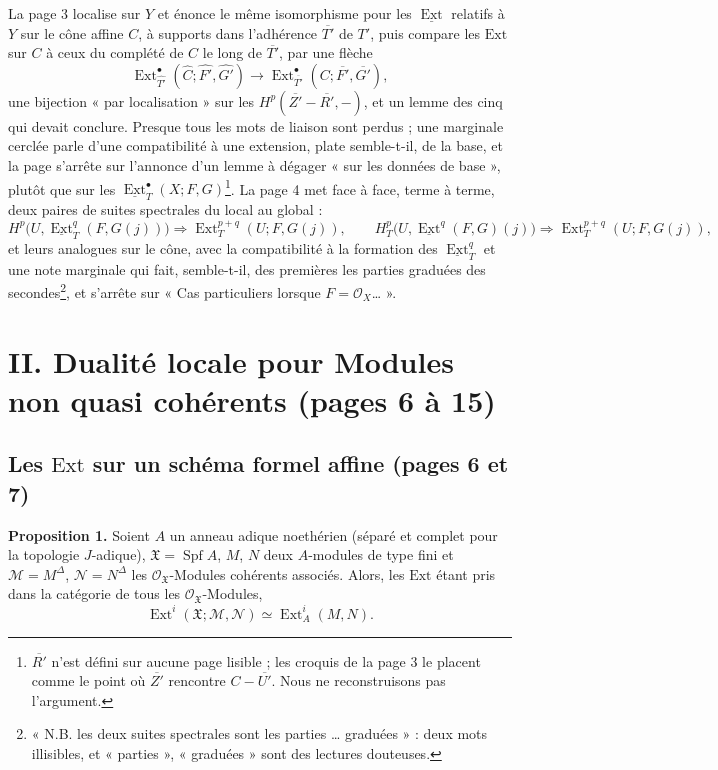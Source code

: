 \documentclass[11pt,a4paper]{article}
\begin{document}
La page 3 localise sur $Y$ et énonce le même isomorphisme pour les
$\underline{\operatorname{Ext}}$ relatifs à $Y$ sur le cône affine $C$, à
supports dans l'adhérence $\overline{T'}$ de $T'$, puis compare les
$\mathrm{Ext}$ sur $C$ à ceux du complété de $C$ le long de $\overline{T'}$,
par une flèche
\[
  \operatorname{Ext}^{\bullet}_{\widehat{T'}}(\widehat{C}; \widehat{F'}, \widehat{G'})
  \longrightarrow \operatorname{Ext}^{\bullet}_{\overline{T'}}(C; \overline{F'}, \overline{G'}),
\]
une bijection « par localisation » sur les
$H^p(\overline{Z'} - \overline{R'}, -)$, et un lemme des cinq qui devait
conclure. Presque tous les mots de liaison sont perdus ; une marginale
cerclée parle d'une compatibilité à une extension, plate semble-t-il, de la
base, et la page s'arrête sur l'annonce d'un lemme à dégager « sur les données
de base », plutôt que sur les $\underline{\operatorname{Ext}}^{\bullet}_T(X; F,
G)$\footnote{$\overline{R'}$ n'est défini sur aucune page lisible ;
les croquis de la page 3 le placent comme le point où $\overline{Z'}$ rencontre
$C - \overline{U'}$. Nous ne reconstruisons pas l'argument.}. La page 4 met
face à face, terme à terme, deux paires de suites spectrales du local au
global :
\[
  H^p\bigl(U, \underline{\operatorname{Ext}}^q_{T}(F, G(j))\bigr) \Rightarrow
  \operatorname{Ext}^{p+q}_{T}(U; F, G(j)),
  \qquad
  H^p_T\bigl(U, \underline{\operatorname{Ext}}^q(F, G)(j)\bigr) \Rightarrow
  \operatorname{Ext}^{p+q}_{T}(U; F, G(j)),
\]
et leurs analogues sur le cône, avec la compatibilité à la formation des
$\underline{\operatorname{Ext}}^q_T$ et une note marginale qui fait, semble-t-il,
des premières les parties graduées des secondes\footnote{« N.B. les deux suites
spectrales sont les parties \ldots{} graduées » : deux mots illisibles, et
« parties », « graduées » sont des lectures douteuses.}, et s'arrête sur « Cas particuliers lorsque $F =
\mathcal{O}_X$… ».

\section*{II. Dualité locale pour Modules non quasi cohérents (pages 6 à 15)}

\subsection*{Les $\mathrm{Ext}$ sur un schéma formel affine (pages 6 et 7)}

\textbf{Proposition 1.} Soient $A$ un anneau adique noethérien (séparé et
complet pour la topologie $J$-adique), $\mathfrak{X} = \operatorname{Spf} A$,
$M$, $N$ deux $A$-modules de type fini et $\mathcal{M} = M^{\Delta}$,
$\mathcal{N} = N^{\Delta}$ les $\mathcal{O}_{\mathfrak{X}}$-Modules cohérents
associés. Alors, les $\mathrm{Ext}$ étant pris dans la catégorie de tous les
$\mathcal{O}_{\mathfrak{X}}$-Modules,
\[
  \operatorname{Ext}^i(\mathfrak{X}; \mathcal{M}, \mathcal{N}) \simeq
  \operatorname{Ext}^i_A(M, N).
\]
\end{document}
